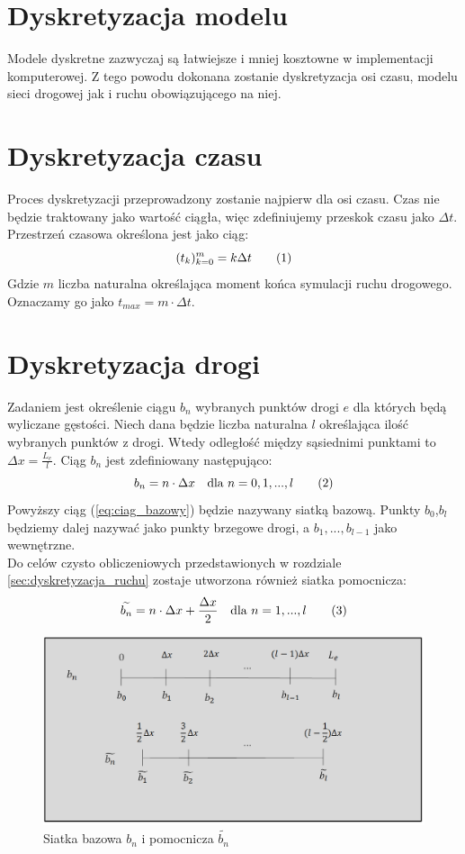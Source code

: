 \documentclass[12pt]{book}
\newcommand\addtag{\refstepcounter{equation}\tag{\theequation}}
\begin{document}
\section{Dyskretyzacja modelu}
Modele dyskretne zazwyczaj są łatwiejsze i mniej kosztowne w implementacji komputerowej. Z tego powodu dokonana zostanie dyskretyzacja osi czasu, modelu sieci drogowej jak i ruchu obowiązującego na niej.
\section{Dyskretyzacja czasu}
Proces dyskretyzacji przeprowadzony zostanie najpierw dla osi czasu. Czas nie będzie traktowany jako wartość ciągła, więc zdefiniujemy przeskok czasu jako $\Delta t$. Przestrzeń czasowa określona jest jako ciąg:
\[
(t_k)_{k=0}^m=k\Delta t \addtag
\]
Gdzie $m$ liczba naturalna określająca moment końca symulacji ruchu drogowego. Oznaczamy go jako $t_{max}=m \cdot \Delta t$.


\section{Dyskretyzacja drogi}
Zadaniem jest określenie ciągu $b_n$ wybranych punktów drogi $e$ dla których będą wyliczane gęstości. Niech dana będzie liczba naturalna $l$ określająca ilość wybranych punktów z drogi. Wtedy odległość między sąsiednimi punktami to $\Delta x=\frac{L_e}{l}$. 
Ciąg $b_n$ jest zdefiniowany następująco: 
\[b_n=n\cdot \Delta x \quad \text{dla }n=0,1,...,l \addtag \label{eq:ciag_bazowy} \]
Powyższy ciąg (\ref{eq:ciag_bazowy}) będzie nazywany siatką bazową. Punkty $b_0$,$b_l$ będziemy dalej nazywać jako punkty brzegowe drogi, a $b_1,...,b_{l-1}$ jako wewnętrzne.\\
Do celów czysto obliczeniowych przedstawionych w rozdziale \ref{sec:dyskretyzacja_ruchu} zostaje utworzona również siatka pomocnicza:
\[\widetilde{b_n}=n\cdot \Delta x+\frac{\Delta x}{2} \quad \text{dla }n=1,...,l \addtag\]

\begin{figure}[H]
  \centering
    \includegraphics[width=14cm]{odcinki-2}
 \caption{Siatka bazowa $b_n$ i pomocnicza $\widetilde{b_n}$}
 \label{fig:siatka}
\end{figure}
\end{document}
